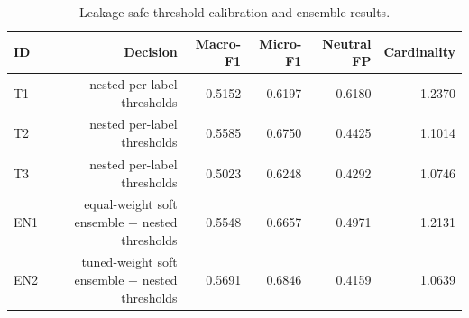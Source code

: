 \begin{table}[t]
\centering
\small
\caption{Leakage-safe threshold calibration and ensemble results.}
\label{tab:threshold-ensemble}
\begin{tabular}{lrrrrr}
\toprule
ID & Decision & Macro-F1 & Micro-F1 & Neutral FP & Cardinality \\
\midrule
T1 & nested per-label thresholds & 0.5152 & 0.6197 & 0.6180 & 1.2370 \\
T2 & nested per-label thresholds & 0.5585 & 0.6750 & 0.4425 & 1.1014 \\
T3 & nested per-label thresholds & 0.5023 & 0.6248 & 0.4292 & 1.0746 \\
EN1 & equal-weight soft ensemble + nested thresholds & 0.5548 & 0.6657 & 0.4971 & 1.2131 \\
EN2 & tuned-weight soft ensemble + nested thresholds & 0.5691 & 0.6846 & 0.4159 & 1.0639 \\
\bottomrule
\end{tabular}
\end{table}
